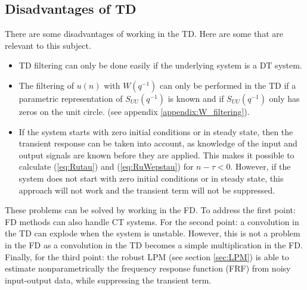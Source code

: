 \subsection{Disadvantages of TD}
There are some disadvantages of working in the TD. Here are some that are relevant to this subject.
\begin{itemize}
    \item TD filtering can only be done easily if the underlying system is a DT system.
    \item The filtering of $u(n)$ with $W(q^{-1})$ can only be performed in the TD if a parametric representation of $S_{UU}(q^{-1})$ is known and if $S_{UU}(q^{-1})$ only has zeros on the unit circle. (see appendix \ref{appendix:W_filtering}).
    \item If the system starts with zero initial conditions or in steady state, then the transient response can be taken into account, as knowledge of the input and output signals are known before they are applied. This makes it possible to calculate (\ref{eq:Rutau}) and (\ref{eq:RuWepstau}) for $n-\tau < 0$. However, if the system does not start with zero initial conditions or in steady state, this approach will not work and the transient term will not be suppressed.
\end{itemize}
These problems can be solved by working in the FD. To address the first point: FD methods can also handle CT systems. For the second point: a convolution in the TD can explode when the system is unstable. However, this is not a problem in the FD as a convolution in the TD becomes a simple multiplication in the FD. Finally, for the third point: the robust LPM (see section \ref{sec:LPM}) is able to estimate nonparametrically the frequency response function (FRF) from noisy input-output data, while suppressing the transient term.




